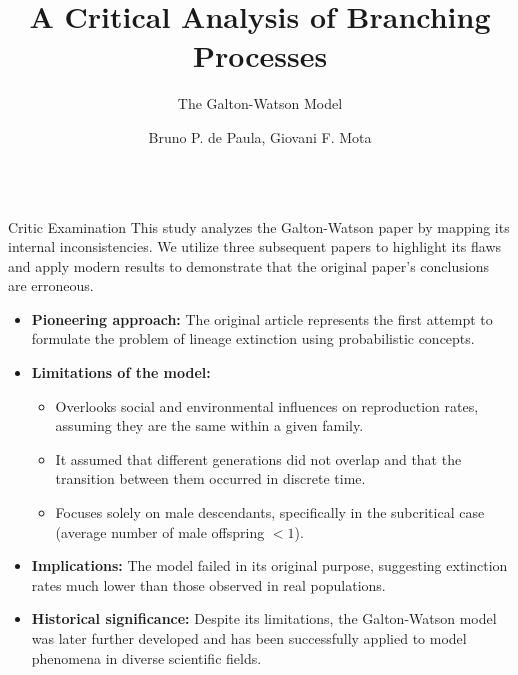 \documentclass[palette=none,mode=dark]{impaTeXPoster}
\title{{\fontsize{80}{90}\selectfont A Critical Analysis of Branching Processes } }
\subtitle{{\fontsize{60}{70}\selectfont The Galton-Watson Model}}
\author{{\fontsize{40}{50}\selectfont Bruno P. de Paula, Giovani F. Mota}}
\begin{document}
\leftlogosize{18cm}{12cm}
\rightlogosize{18cm}{12cm}

\maketitle

\begin{columns}




\begin{postercard}{Critic Examination}
This study analyzes the Galton-Watson paper by mapping its internal inconsistencies. We utilize three subsequent papers to highlight its flaws and apply modern results to demonstrate that the original paper's conclusions are erroneous.
    \begin{itemize}
        \item \textbf{Pioneering approach:} The original article represents the first attempt to formulate the problem of lineage extinction using probabilistic concepts.
        \item \textbf{Limitations of the model:}
        \begin{itemize}
            \item Overlooks social and environmental influences on reproduction rates, assuming they are the same within a given family.
            \item It assumed that different generations did not overlap and that the transition between them occurred in discrete time.
            \item Focuses solely on male descendants, specifically in the subcritical case (average number of male offspring $<1$).
        \end{itemize}
        \item \textbf{Implications:} The model failed in its original purpose, suggesting extinction rates much lower than those observed in real populations.
        \item \textbf{Historical significance:} Despite its limitations, the Galton-Watson model was later further developed and has been successfully applied to model phenomena in diverse scientific fields.
    \end{itemize}
\end{postercard}


\end{columns}
\end{document}
